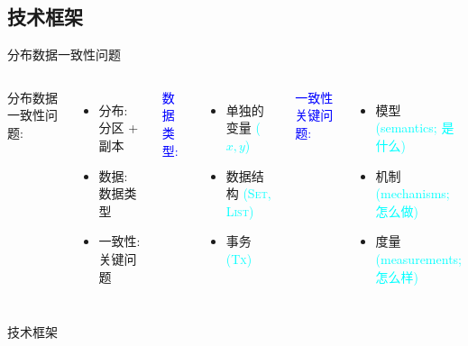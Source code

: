 \subsection{技术框架}

\begin{frame}{分布数据一致性问题}
  \begin{columns}
	  分布数据一致性问题:
	  \begin{itemize}
		\item [\textcolor{blue}{\bf \cmark}] 分布: 分区 + 副本
		\item [\textcolor{red}{\bf \xmark}] 数据: 数据类型
		\item [\textcolor{red}{\bf \xmark}] 一致性: 关键问题
	  \end{itemize}
	\pause
	  \textcolor{blue}{数据类型:}
	  \begin{itemize}
		\item 单独的变量 \textcolor{cyan}{\small ($x,y$)}
		\item 数据结构 \textcolor{cyan}{\small (\textsc{Set, List})}
		\item 事务 \textcolor{cyan}{\small (\textsc{Tx})}
	  \end{itemize}

	  \pause
	  \vspace{0.80cm}

	  \textcolor{blue}{一致性关键问题:}
	  \begin{itemize}
		\item 模型 \textcolor{cyan}{\small (semantics; 是什么)}
		\item 机制 \textcolor{cyan}{\small (mechanisms; 怎么做)}
		\item 度量 \textcolor{cyan}{\small (measurements; 怎么样)}
	  \end{itemize}
  \end{columns}
\end{frame}
\begin{frame}{技术框架}
\end{frame}

